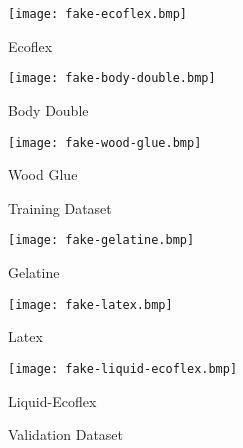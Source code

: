 \begin{minipage}[r]{0.5\textwidth}
    \begin{minipage}[r]{0.3\textwidth}
        \centering
        \texttt{[image: fake-ecoflex.bmp]}
        \vspace{-10mm}\caption{Ecoflex}
    \end{minipage}
    \begin{minipage}[r]{0.3\textwidth}
        \centering
        \texttt{[image: fake-body-double.bmp]}
        \vspace{-10mm}\caption{Body Double}
    \end{minipage}
    \begin{minipage}[r]{0.3\textwidth}
        \centering
        \texttt{[image: fake-wood-glue.bmp]}
        \vspace{-10mm}\caption{Wood Glue}        
    \end{minipage}
    \caption{Training Dataset}
\end{minipage}
\vrule
\begin{minipage}[r]{0.5\textwidth}
    \begin{minipage}[r]{0.3\textwidth}
        \centering
        \texttt{[image: fake-gelatine.bmp]}
        \vspace{-10mm}\caption{Gelatine}
    \end{minipage}
    \begin{minipage}[r]{0.3\textwidth}
        \centering
        \texttt{[image: fake-latex.bmp]}
        \vspace{-10mm}\caption{Latex}
    \end{minipage}
    \begin{minipage}[r]{0.3\textwidth}
        \centering
        \texttt{[image: fake-liquid-ecoflex.bmp]}
        \vspace{-10mm}\caption{Liquid-Ecoflex}        
    \end{minipage}
    \caption{Validation Dataset}
\end{minipage}